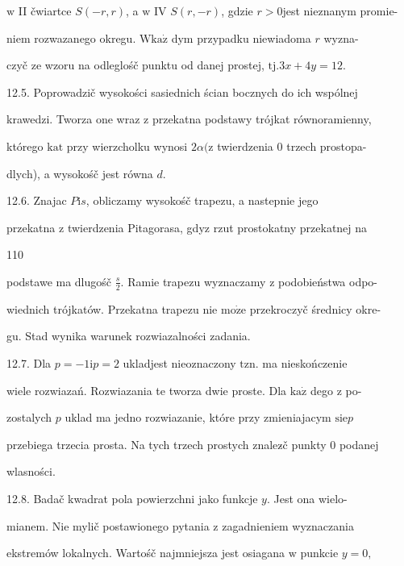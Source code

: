 \documentclass[a4paper,12pt]{article}
\begin{document}
$\mathrm{w}$ II čwiartce $S(-r,r)$, a $\mathrm{w}$ IV $S(r,-r)$, gdzie $r>0$jest nieznanym promie-

niem rozwazanego okregu. $\mathrm{W} \mathrm{k}\mathrm{a}\dot{\mathrm{z}}$ dym przypadku niewiadoma $r$ wyzna-

czyč ze wzoru na odleglośč punktu od danej prostej, $\mathrm{t}\mathrm{j}. 3x+4y=12.$

12.5. Poprowadzič wysokości sasiednich ścian bocznych do ich wspólnej

krawedzi. Tworza one wraz $\mathrm{z}$ przekatna podstawy trójkat równoramienny,

którego $\mathrm{k}\mathrm{a}\mathrm{t}$ przy wierzcholku wynosi $ 2\alpha (\mathrm{z}$ twierdzenia $0$ trzech prostopa-

dlych), a wysokośč jest równa $d.$

12.6. Znajac $P \mathrm{i} s$, obliczamy wysokośč trapezu, a nastepnie jego

przekatna $\mathrm{z}$ twierdzenia Pitagorasa, gdyz rzut prostokatny przekatnej na





110

podstawe ma dlugośč $\displaystyle \frac{s}{2}$. Ramie trapezu wyznaczamy $\mathrm{z}$ podobieństwa odpo-

wiednich trójkatów. Przekatna trapezu nie $\mathrm{m}\mathrm{o}\dot{\mathrm{z}}\mathrm{e}$ przekroczyč średnicy okre-

gu. Stad wynika warunek rozwiazalności zadania.

12.7. Dla $p=-1\mathrm{i}p=2$ ukladjest nieoznaczony $\mathrm{t}\mathrm{z}\mathrm{n}$. ma nieskończenie

wiele rozwiazań. Rozwiazania te tworza dwie proste. Dla $\mathrm{k}\mathrm{a}\dot{\mathrm{z}}$ dego $\mathrm{z}$ po-

zostalych $p$ uklad ma jedno rozwiazanie, które przy zmieniajacym $\mathrm{s}\mathrm{i}\mathrm{e}p$

przebiega trzecia prosta. Na tych trzech prostych znalez$\acute{}$č punkty $0$ podanej

wlasności.

12.8. Badač kwadrat pola powierzchni jako funkcje $y$. Jest ona wielo-

mianem. Nie mylič postawionego pytania $\mathrm{z}$ zagadnieniem wyznaczania

ekstremów lokalnych. Wartośč najmniejsza jest osiagana $\mathrm{w}$ punkcie $y=0,$
\end{document}
